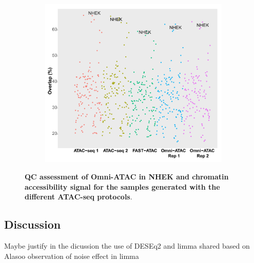 \begin{figure}[htbp]
\begin{subfigure}{0.5\textwidth}
\caption{\textbf{}}
\end{subfigure}
\begin{subfigure}{0.5\textwidth}
\centering
\includegraphics[width=\textwidth]{./Results1/pdfs/ENCODE_125_cell_types_overlap_FAST_ATAC_Omni_ATAC_qval_2}
\caption{\textbf{}} %
\end{subfigure}%
\caption[QC assessment of Omni-ATAC in NHEK and chromatin accessibility signal for the samples generated with the different ATAC-seq protocols]{\textbf{QC assessment of Omni-ATAC in NHEK and chromatin accessibility signal for the samples generated with the different ATAC-seq protocols}.\\}
\label{fig:Omni_ATAC_NHEK_QC_assessment_and_all_tracks}
\end{figure} 


\subsection{Discussion}
Maybe justify in the dicussion the use of DESEq2 and limma shared based on Alasoo observation of noise effect in limma